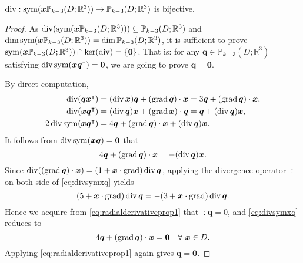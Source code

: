 \begin{lemma}\label{lem:divsymtensoronto}
 $\operatorname{div}: \operatorname{sym} (\boldsymbol  x \mathbb P_{k-3}(D;\mathbb R^3)) \to \mathbb P_{k-3}(D;\mathbb R^3)$ is bijective.
\end{lemma}
\begin{proof}
As $\operatorname{div}(\operatorname{sym} (\boldsymbol  x \mathbb P_{k-3}(D;\mathbb R^3))) \subseteq \mathbb P_{k-3}(D;\mathbb R^3)$ and $\dim\operatorname{sym} (\boldsymbol  x \mathbb P_{k-3}(D;\mathbb R^3))=\dim\mathbb P_{k-3}(D;\mathbb R^3)$, it is sufficient to prove $\operatorname{sym} (\boldsymbol  x \mathbb P_{k-3}(D;\mathbb R^3))\cap\ker(\operatorname{div})=\{\boldsymbol0\}$. That is: for any $\boldsymbol q\in\mathbb P_{k-3}(D;\mathbb R^3)$ satisfying $\operatorname{div}\operatorname{sym}(\boldsymbol  x \boldsymbol q^{\intercal})=\boldsymbol0$, we are going to prove $\boldsymbol q =\boldsymbol 0$. 

By direct computation,
\begin{align*}
\operatorname{div} (\boldsymbol  q\boldsymbol  x^{\intercal}) &= (\operatorname{div} \boldsymbol  x) \boldsymbol  q +  (\operatorname{grad} \boldsymbol  q) \cdot \boldsymbol  x = 3\boldsymbol  q + (\operatorname{grad} \boldsymbol  q) \cdot \boldsymbol  x,\\
\operatorname{div} (\boldsymbol  x\boldsymbol  q^{\intercal}) & = (\operatorname{div} \boldsymbol  q) \boldsymbol  x + (\operatorname{grad} \boldsymbol  x)\cdot \boldsymbol  q = \boldsymbol  q + (\operatorname{div} \boldsymbol  q) \boldsymbol  x, \\
2\operatorname{div} \operatorname{sym}(\boldsymbol x\boldsymbol q^{\intercal}) & = 4\boldsymbol  q + (\operatorname{grad} \boldsymbol  q) \cdot \boldsymbol  x + (\operatorname{div} \boldsymbol  q) \boldsymbol  x.
\end{align*}
It follows from $\operatorname{div} \operatorname{sym}(\boldsymbol  x\boldsymbol q)=\boldsymbol 0$ that 
\begin{equation}\label{eq:divsymxq}
4\boldsymbol  q + (\operatorname{grad} \boldsymbol  q) \cdot \boldsymbol  x = - (\operatorname{div} \boldsymbol  q) \boldsymbol  x.
\end{equation}
Since $\operatorname{div}((\operatorname{grad} \boldsymbol  q) \cdot \boldsymbol  x)=(1+\boldsymbol  x\cdot\operatorname{grad})\operatorname{div}\boldsymbol  q$,
applying the divergence operator $\div$ on both side of \eqref{eq:divsymxq} yields
$$
(5+\boldsymbol  x\cdot\operatorname{grad})\operatorname{div}\boldsymbol  q=-(3+\boldsymbol  x\cdot\operatorname{grad})\operatorname{div}\boldsymbol  q.
$$
Hence we acquire from \eqref{eq:radialderivativeprop1} that $\div\boldsymbol  q=0$, and \eqref{eq:divsymxq} reduces to
\[
4\boldsymbol  q + (\operatorname{grad} \boldsymbol  q) \cdot \boldsymbol  x =\boldsymbol0 \quad \forall~\boldsymbol  x\in D.
\]
Applying \eqref{eq:radialderivativeprop1} again gives $\boldsymbol q=\boldsymbol 0$. %
\end{proof}

